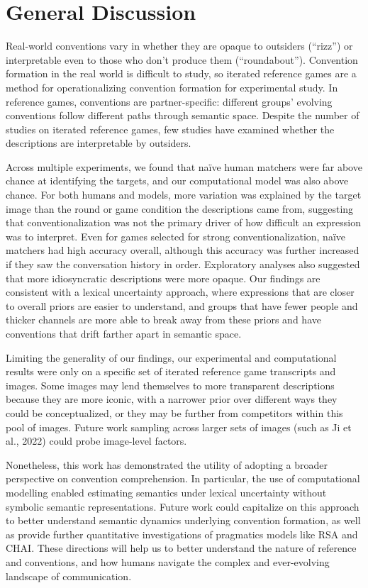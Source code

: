 \documentclass[10pt, letterpaper]{article}
\begin{document}
\section{General Discussion}\label{general-discussion}

Real-world conventions vary in whether they are opaque to outsiders
(``rizz'') or interpretable even to those who don't produce them
(``roundabout''). Convention formation in the real world is difficult to
study, so iterated reference games are a method for operationalizing
convention formation for experimental study. In reference games,
conventions are partner-specific: different groups' evolving conventions
follow different paths through semantic space. Despite the number of
studies on iterated reference games, few studies have examined whether
the descriptions are interpretable by outsiders.

Across multiple experiments, we found that naïve human matchers were far
above chance at identifying the targets, and our computational model was
also above chance. For both humans and models, more variation was
explained by the target image than the round or game condition the
descriptions came from, suggesting that conventionalization was not the
primary driver of how difficult an expression was to interpret. Even for
games selected for strong conventionalization, naïve matchers had high
accuracy overall, although this accuracy was further increased if they
saw the conversation history in order. Exploratory analyses also
suggested that more idiosyncratic descriptions were more opaque. Our
findings are consistent with a lexical uncertainty approach, where
expressions that are closer to overall priors are easier to understand,
and groups that have fewer people and thicker channels are more able to
break away from these priors and have conventions that drift farther
apart in semantic space.

Limiting the generality of our findings, our experimental and
computational results were only on a specific set of iterated reference
game transcripts and images. Some images may lend themselves to more
transparent descriptions because they are more iconic, with a narrower
prior over different ways they could be conceptualized, or they may be
further from competitors within this pool of images. Future work
sampling across larger sets of images (such as Ji et al., 2022) could
probe image-level factors.

Nonetheless, this work has demonstrated the utility of adopting a
broader perspective on convention comprehension. In particular, the use
of computational modelling enabled estimating semantics under lexical
uncertainty without symbolic semantic representations. Future work could
capitalize on this approach to better understand semantic dynamics
underlying convention formation, as well as provide further quantitative
investigations of pragmatics models like RSA and CHAI. These directions
will help us to better understand the nature of reference and
conventions, and how humans navigate the complex and ever-evolving
landscape of communication.
\end{document}
